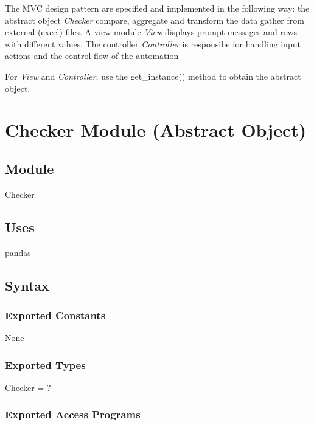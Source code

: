 \documentclass[12pt]{article}
\begin{document}
\medskip

\noindent The MVC design pattern are specified and implemented in the following way: 
the abstract object \textit{Checker} compare, aggregate and transform the data gather 
from external (excel) files. A view module \textit{View} displays prompt messages and 
rows with different values. The controller \textit{Controller} is responsibe for handling 
input actions and the control flow of the automation

\medskip

\noindent For \textit{View} and \textit{Controller}, use the get\_instance() method to obtain the abstract object.

\newpage

\section* {Checker Module (Abstract Object)}

\subsection*{Module}

Checker

\subsection* {Uses}

pandas

\subsection* {Syntax}

\subsubsection* {Exported Constants}

None

\subsubsection* {Exported Types}

Checker = ?

\subsubsection* {Exported Access Programs}
\end{document}

